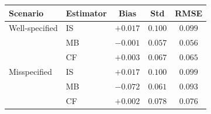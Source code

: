 \begin{tabular}{llccc}
\hline\hline
Scenario & Estimator & Bias & Std & RMSE \\
\hline
Well-specified & IS & $+0.017$ & $0.100$ & $0.099$ \\
 & MB & $-0.001$ & $0.057$ & $0.056$ \\
 & CF & $+0.003$ & $0.067$ & $0.065$ \\
\hline
Misspecified & IS & $+0.017$ & $0.100$ & $0.099$ \\
 & MB & $-0.072$ & $0.061$ & $0.093$ \\
 & CF & $+0.002$ & $0.078$ & $0.076$ \\
\hline\hline
\end{tabular}
